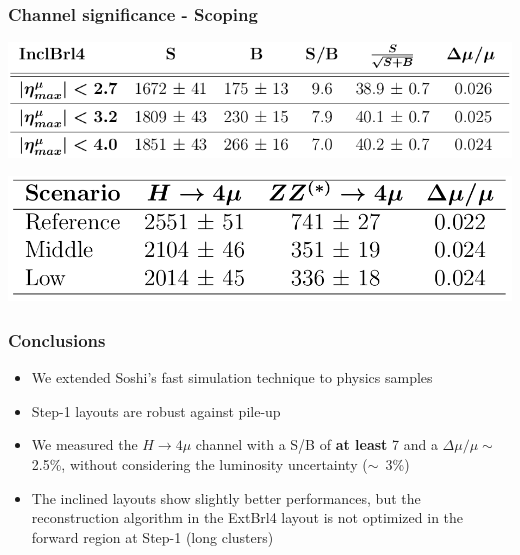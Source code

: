 \documentclass{beamer}
\begin{document}
\begin{frame}[t]
\frametitle{Channel significance - Scoping}

\includegraphics[width=.8\textwidth]{significanceInclBrl4}

\bigskip

\includegraphics[width=.6\textwidth]{scopingSignificance}

\end{frame}


\begin{frame}
\frametitle{Conclusions}
\begin{itemize}
\item<1-> We extended Soshi's fast simulation technique to physics samples
\item<2-> Step-1 layouts are robust against pile-up
\item<3-> We measured the $H \rightarrow 4\mu$ channel with a S/B of \textbf{at least} 7 and
a $\Delta\mu/\mu \sim$ 2.5\%, without considering the luminosity uncertainty \mbox{($\sim$ 3\%)}
\item<4-> The inclined layouts show slightly better performances, but the reconstruction
algorithm in the ExtBrl4 layout is not 
optimized in the forward region at Step-1 (long clusters)
\end{itemize}

\end{frame}
\end{document}
